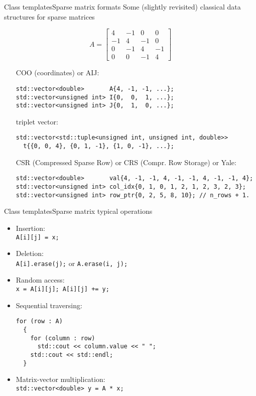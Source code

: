 \documentclass[9pt]{beamer}
\begin{document}
\begin{frame}[fragile]{Class templates}{Sparse matrix formats}
Some (slightly revisited) classical data structures for sparse matrices

\begin{equation*}
A = 
\begin{bmatrix}
4  & -1 & 0  & 0\\
-1 &  4 & -1 & 0\\
0  & -1 &  4 & -1\\
0  &  0 &  -1& 4
\end{bmatrix}
\end{equation*}

\begin{itemize}
\item [COO] (coordinates) or AIJ: \tiny
\begin{lstlisting}
std::vector<double>       A{4, -1, -1, ...};
std::vector<unsigned int> I{0,  0,  1, ...};
std::vector<unsigned int> J{0,  1,  0, ...};
\end{lstlisting} \normalsize
\item [triplet] vector:\tiny
\begin{lstlisting}
std::vector<std::tuple<unsigned int, unsigned int, double>> 
  t{{0, 0, 4}, {0, 1, -1}, {1, 0, -1}, ...};
\end{lstlisting} \normalsize
\item [CSR] (Compressed Sparse Row) or CRS (Compr. Row Storage) or Yale:\tiny
\begin{lstlisting}
std::vector<double>       val{4, -1, -1, 4, -1, -1, 4, -1, -1, 4};
std::vector<unsigned int> col_idx{0, 1, 0, 1, 2, 1, 2, 3, 2, 3};
std::vector<unsigned int> row_ptr{0, 2, 5, 8, 10}; // n_rows + 1.
\end{lstlisting} 
\end{itemize}
\end{frame}

\begin{frame}[fragile]{Class templates}{Sparse matrix typical operations} 
\begin{itemize}
\item Insertion: \\
\lstinline|A[i][j] = x;|
\item Deletion: \\
\lstinline|A[i].erase(j);| or \lstinline|A.erase(i, j);|
\item Random access: \\
\lstinline|x = A[i][j]; A[i][j] += y;|
\item Sequential traversing:
\small\begin{lstlisting}
for (row : A)
  {
    for (column : row)
      std::cout << column.value << " ";
    std::cout << std::endl;
  }
\end{lstlisting}\normalsize
\item Matrix-vector multiplication:\\
\lstinline|std::vector<double> y = A * x;|
\end{itemize}
\end{frame}
\end{document}
